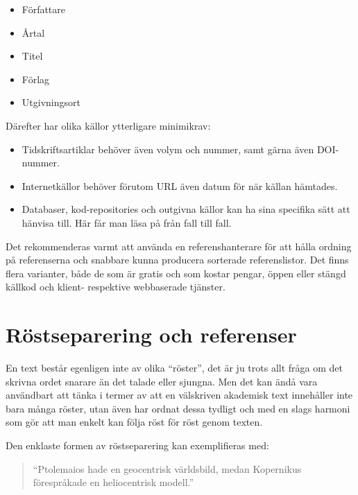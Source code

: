 \documentclass[11pt,a5paper,footinclude=true,headinclude=true]{scrbook} %
\begin{document}
\begin{small}
\begin{itemize}
\item Författare
\item Årtal
\item Titel
\item Förlag
\item Utgivningsort
\end{itemize}
\end{small}

\noindent Därefter har olika källor ytterligare minimikrav:

\begin{small}
\begin{itemize}
\item Tidskriftsartiklar behöver även volym och nummer, samt gärna även DOI-nummer.
\item Internetkällor behöver förutom URL även datum för när källan hämtades.
\item  Databaser, kod-repositories och outgivna källor kan ha sina specifika sätt att hänvisa till. Här får man läsa på från fall till fall.
\end{itemize}
\end{small}

\noindent Det rekommenderas varmt att använda en referenshanterare för att hålla ordning på referenserna och snabbare kunna producera sorterade referenslistor. Det finns flera varianter, både de som är gratis och som kostar pengar, öppen eller stängd källkod och klient- respektive webbaserade tjänster. 

\section{Röstseparering och referenser}

En text består egenligen inte av olika ``röster'', det är ju trots allt fråga om det skrivna ordet snarare än det talade eller sjungna. Men det kan ändå vara användbart att tänka i termer av att en välskriven akademisk text innehåller inte bara många röster, utan även har ordnat dessa tydligt och med en slags harmoni som gör att man enkelt kan följa röst för röst genom texten. 

Den enklaste formen av röstseparering kan exemplifieras med:

\begin{quote}
``Ptolemaios hade en geocentrisk världsbild, medan Kopernikus förespråkade en heliocentrisk modell.''
\end{quote}
\end{document}
